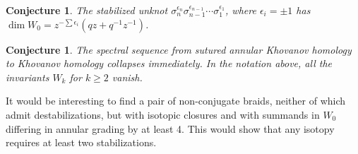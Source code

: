 \documentclass{amsart}
\theoremstyle{plain}
\newtheorem{conj}[prop]{Conjecture}
\begin{document}
\begin{conj}
The stabilized unknot $\sigma_n^{\epsilon_n} \sigma_{n-1}^{\epsilon_{n-1}} \cdots \sigma_1^{\epsilon_1}$, where $\epsilon_i = \pm 1$ has
$\dim W_0  = z^{- \sum \epsilon_i} (q z + q^{-1} z^{-1})$.
\end{conj}

\begin{conj}
The spectral sequence from sutured annular Khovanov homology to Khovanov homology collapses immediately. In the notation above, all the invariants $W_k$ for $k \geq 2$ vanish.
\end{conj}

It would be interesting to find a pair of non-conjugate braids, neither of which admit destabilizations, but with isotopic closures and with summands in $W_0$ differing in annular grading by at least 4. This would show that any isotopy requires at least two stabilizations.




\end{document}
